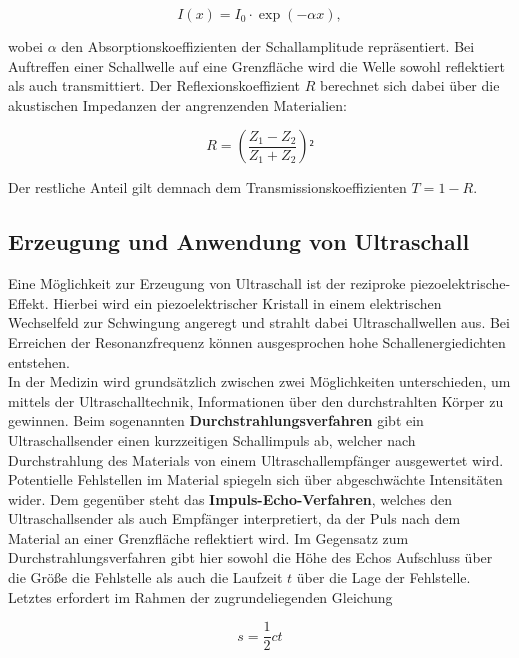 \begin{equation*}
\label{eqn:Intensitaet}
    I(x) = I_0\cdot\exp{}\left(-\alpha{}x\right),
\end{equation*}

\noindent wobei $\alpha$ den Absorptionskoeffizienten der Schallamplitude repräsentiert. Bei Auftreffen einer Schallwelle auf 
eine Grenzfläche wird die Welle sowohl reflektiert als auch transmittiert. Der Reflexionskoeffizient $R$ berechnet sich dabei 
über die akustischen Impedanzen der angrenzenden Materialien:

\begin{equation*}
    R = \left(\frac{Z_1 - Z_2}{Z_1 + Z_2}\right)²
\end{equation*}

\noindent Der restliche Anteil gilt demnach dem Transmissionskoeffizienten $T = 1-R$.

\subsection{Erzeugung und Anwendung von Ultraschall}

\noindent Eine Möglichkeit zur Erzeugung von Ultraschall ist der reziproke piezoelektrische-Effekt. Hierbei wird ein piezoelektrischer 
Kristall in einem elektrischen Wechselfeld zur Schwingung angeregt und strahlt dabei Ultraschallwellen aus. Bei Erreichen der
Resonanzfrequenz können ausgesprochen hohe Schallenergiedichten entstehen.\\

\noindent In der Medizin wird grundsätzlich zwischen zwei Möglichkeiten unterschieden, um mittels der Ultraschalltechnik, Informationen 
über den durchstrahlten Körper zu gewinnen. Beim sogenannten \textbf{Durchstrahlungsverfahren} gibt ein Ultraschallsender einen 
kurzzeitigen Schallimpuls ab, welcher nach Durchstrahlung des Materials von einem Ultraschallempfänger ausgewertet wird. 
Potentielle Fehlstellen im Material spiegeln sich über abgeschwächte Intensitäten wider. Dem gegenüber steht das 
\textbf{Impuls-Echo-Verfahren}, welches den Ultraschallsender als auch Empfänger interpretiert, da der Puls nach dem Material an 
einer Grenzfläche reflektiert wird. Im Gegensatz zum Durchstrahlungsverfahren gibt hier sowohl die Höhe des Echos Aufschluss über 
die Größe die Fehlstelle als auch die Laufzeit $t$ über die Lage der Fehlstelle. Letztes erfordert im Rahmen der zugrundeliegenden
Gleichung 

\begin{equation*}
    s = \frac{1}{2}ct 
\end{equation*}

